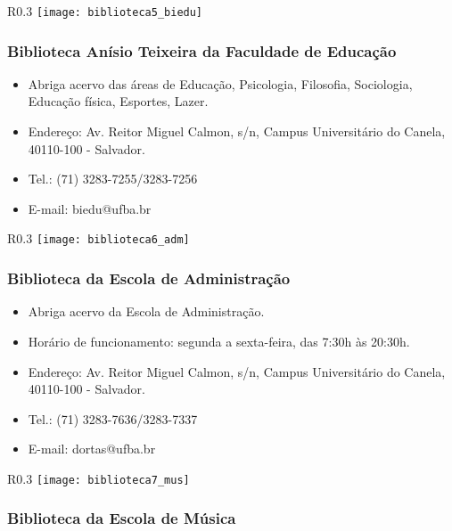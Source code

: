         \begin{wrapfigure}{R}{0.3\textwidth}
            \centering
            \texttt{[image: biblioteca5\_biedu]}
        \end{wrapfigure}
    \subsubsection{Biblioteca Anísio Teixeira da Faculdade de Educação}
        \begin{itemize}
            \item Abriga acervo das áreas de Educação, Psicologia, Filosofia, Sociologia, Educação física, Esportes, Lazer.
            \item Endereço: Av. Reitor Miguel Calmon, s/n, Campus Universitário do Canela, 40110-100 - Salvador.
            \item Tel.: (71) 3283-7255/3283-7256
            \item E-mail: biedu@ufba.br
        \end{itemize}
        
        \begin{wrapfigure}{R}{0.3\textwidth}
            \centering
            \texttt{[image: biblioteca6\_adm]}
        \end{wrapfigure}
    \subsubsection{Biblioteca da Escola de Administração}
        \begin{itemize}
            \item Abriga acervo da Escola de Administração.
            \item Horário de funcionamento: segunda a sexta-feira, das 7:30h às 20:30h.
            \item Endereço: Av. Reitor Miguel Calmon, s/n, Campus Universitário do Canela, 40110-100 - Salvador.
            \item Tel.: (71) 3283-7636/3283-7337
            \item E-mail: dortas@ufba.br
        \end{itemize}
        \begin{wrapfigure}{R}{0.3\textwidth}
            \centering
            \texttt{[image: biblioteca7\_mus]}
        \end{wrapfigure}
    \subsubsection{Biblioteca da Escola de Música}
        
